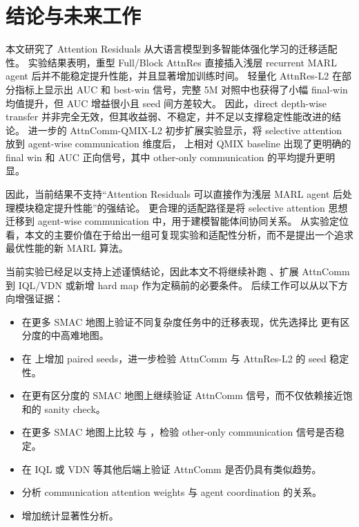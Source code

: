 \section{结论与未来工作}

本文研究了 Attention Residuals 从大语言模型到多智能体强化学习的迁移适配性。
实验结果表明，重型 Full/Block AttnRes 直接插入浅层 recurrent MARL agent 后并不能稳定提升性能，并且显著增加训练时间。
轻量化 AttnRes-L2 在部分指标上显示出 AUC 和 best-win 信号，完整 5M  对照中也获得了小幅 final-win 均值提升，但 AUC 增益很小且 seed 间方差较大。
因此，direct depth-wise transfer 并非完全无效，但其收益弱、不稳定，并不足以支撑稳定性能改进的结论。
进一步的 AttnComm-QMIX-L2 初步扩展实验显示，将 selective attention 放到 agent-wise communication 维度后， 上相对 QMIX baseline 出现了更明确的 final win 和 AUC 正向信号，其中 other-only communication 的平均提升更明显。

因此，当前结果不支持“Attention Residuals 可以直接作为浅层 MARL agent 后处理模块稳定提升性能”的强结论。
更合理的适配路径是将 selective attention 思想迁移到 agent-wise communication 中，用于建模智能体间协同关系。
从实验定位看，本文的主要价值在于给出一组可复现实验和适配性分析，而不是提出一个追求最优性能的新 MARL 算法。

当前实验已经足以支持上述谨慎结论，因此本文不将继续补跑 、扩展 AttnComm 到 IQL/VDN 或新增 hard map 作为定稿前的必要条件。
后续工作可以从以下方向增强证据：

\begin{itemize}
  \item 在更多 SMAC 地图上验证不同复杂度任务中的迁移表现，优先选择比  更有区分度的中高难地图。
  \item 在  上增加 paired seeds，进一步检验 AttnComm 与 AttnRes-L2 的 seed 稳定性。
  \item 在更有区分度的 SMAC 地图上继续验证 AttnComm 信号，而不仅依赖接近饱和的  sanity check。
  \item 在更多 SMAC 地图上比较  与 ，检验 other-only communication 信号是否稳定。
  \item 在 IQL 或 VDN 等其他后端上验证 AttnComm 是否仍具有类似趋势。
  \item 分析 communication attention weights 与 agent coordination 的关系。
  \item 增加统计显著性分析。
\end{itemize}
